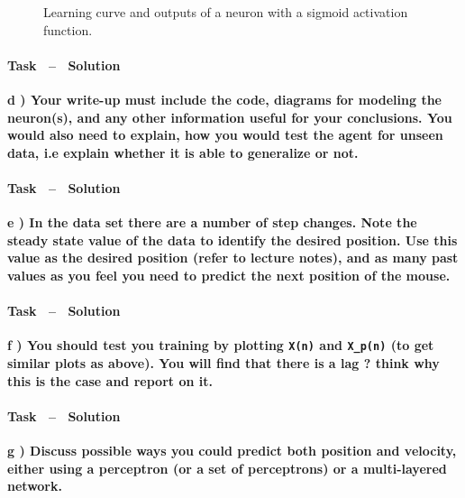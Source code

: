 \documentclass[12pt, a4paper]{article}
\newcounter{task}
\newcommand{\task}{\stepcounter{task}\paragraph{Task \thetask~--~
Solution}}
\begin{document}
\begin{figure}[htbp]
	\caption{Learning curve and outputs of a neuron with a sigmoid activation function.}
	\label{fig:neuron}
\end{figure}

\task{\textbf{d ) Your write-up must include the code, diagrams for modeling the neuron(s), and any other information useful for your conclusions. You would also need to explain, how you would test the agent for unseen data, i.e explain whether it is able to generalize or not.}}\\

\task{\textbf{e ) In the data set there are a number of step changes. Note the steady state value of the data to identify the desired position. Use this value as the desired position (refer to lecture notes), and as many past values as you feel you need to predict the next position of the mouse.}}\\

\task{\textbf{f ) You should test you training by plotting \texttt{X(n)} and \texttt{X\_p(n)} (to get similar plots as above). You will find that there is a lag ? think why this is the case and report on it.}}\\

\task{\textbf{g ) Discuss possible ways you could predict both position and velocity, either using a perceptron (or a set of perceptrons) or a multi-layered network.}}\\
\end{document}
